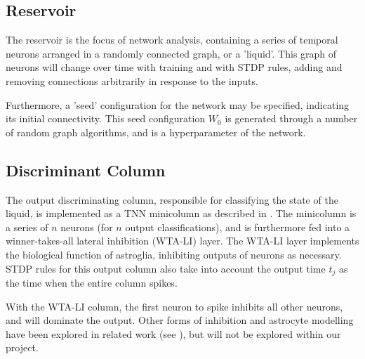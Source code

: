 \subsection{Reservoir}

The reservoir is the focus of network analysis, containing a series of temporal
neurons arranged in a randomly connected graph, or a 'liquid'. This graph of
neurons will change over time with training and with STDP rules, adding and
removing connections arbitrarily in response to the inputs.

Furthermore, a 'seed' configuration for the network may be specified, indicating
its initial connectivity. This seed configuration $W_0$ is generated through a
number of random graph algorithms, and is a hyperparameter of the network.

\subsection{Discriminant Column}

The output discriminating column, responsible for classifying the state of the
liquid, is implemented as a TNN minicolumn as described in \cite{TNN}. The
minicolumn is a series of $n$ neurons (for $n$ output classifications), and is
furthermore fed into a winner-takes-all lateral inhibition (WTA-LI) layer. The
WTA-LI layer implements the biological function of astroglia, inhibiting outputs
of neurons as necessary. STDP rules for this output column also take into
account the output time $t_j$ as the time when the entire column spikes.

With the WTA-LI column, the first neuron to spike inhibits all other neurons,
and will dominate the output. Other forms of inhibition and astrocyte modelling
have been explored in related work (see \cite{Astrocyte}), but will not be
explored within our project.